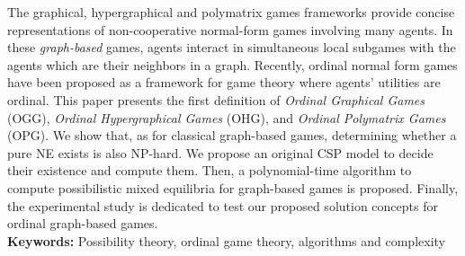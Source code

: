  
 The graphical, hypergraphical and polymatrix games frameworks provide concise representations of non-cooperative normal-form games involving many agents. In these {\em graph-based} games, agents interact in simultaneous local subgames with the agents which are their neighbors in a graph. 
Recently, ordinal normal form games have been proposed as a framework for game theory where agents' utilities are ordinal. 
This paper presents the first definition of \emph{Ordinal Graphical Games} (OGG),  \emph{Ordinal Hypergraphical Games} (OHG), and \emph{Ordinal Polymatrix Games} (OPG). 
We show that, as for classical graph-based games, determining whether a pure NE exists is also NP-hard. We propose an original CSP model to decide their existence and compute them.
Then, a polynomial-time algorithm to compute possibilistic mixed equilibria for graph-based games is proposed. Finally, the experimental study is dedicated to test our proposed solution concepts for ordinal graph-based games.\\
{\bf Keywords:} Possibility theory, ordinal game theory, algorithms and complexity 


